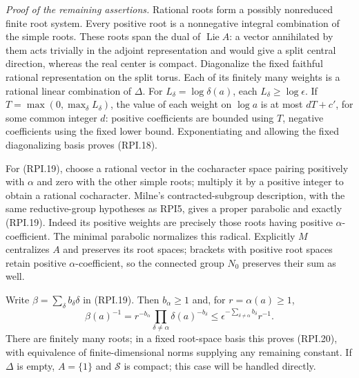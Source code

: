 \emph{Proof of the remaining assertions.}
Rational roots form a possibly nonreduced finite root system.
Every positive root is a nonnegative integral combination
of the simple roots.  These roots span the dual of
\(\operatorname{Lie}A\): a vector annihilated by them acts
trivially in the adjoint representation and would give a
split central direction, whereas the real center is compact.
Diagonalize the fixed faithful rational representation on
the split torus.  Each of its finitely many weights is a
rational linear combination of \(\Delta\).
For \(L_\delta=\log\delta(a)\), each \(L_\delta\ge\log\epsilon\).
If \(T=\max(0,\max_\delta L_\delta)\), the value of each
weight on \(\log a\) is at most \(dT+c'\), for some common
integer \(d\): positive coefficients are bounded using \(T\),
negative coefficients using the fixed lower bound.
Exponentiating and allowing the fixed diagonalizing basis
proves (RPI.18).

For (RPI.19), choose a rational vector in the cocharacter
space pairing positively with \(\alpha\) and zero with the
other simple roots; multiply it by a positive integer to
obtain a rational cocharacter.  Milne's contracted-subgroup
description, with the same reductive-group hypotheses as
RPI5, gives a proper parabolic and exactly (RPI.19).
Indeed its positive weights are precisely those roots having
positive \(\alpha\)-coefficient.  The minimal parabolic
normalizes this radical.  Explicitly \(M\) centralizes \(A\)
and preserves its root spaces; brackets with positive root
spaces retain positive \(\alpha\)-coefficient, so the
connected group \(N_0\) preserves their sum as well.

Write \(\beta=\sum_\delta b_\delta\delta\) in (RPI.19).
Then \(b_\alpha\ge1\) and, for \(r=\alpha(a)\ge1\),
\[
       \beta(a)^{-1}
       =r^{-b_\alpha}\prod_{\delta\ne\alpha}
                                          \delta(a)^{-b_\delta}
       \le \epsilon^{-\sum_{\delta\ne\alpha}b_\delta}r^{-1}.
 \tag{RPI.21}
\]
There are finitely many roots; in a fixed root-space basis
this proves (RPI.20), with equivalence of finite-dimensional
norms supplying any remaining constant.  If \(\Delta\) is
empty, \(A=\{1\}\) and \(\mathcal S\) is compact; this case
will be handled directly.

